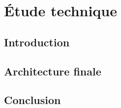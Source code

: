 \chapter{Étude technique}

\section*{Introduction}




\section{Architecture finale}


\section{Conclusion}


\newpage
